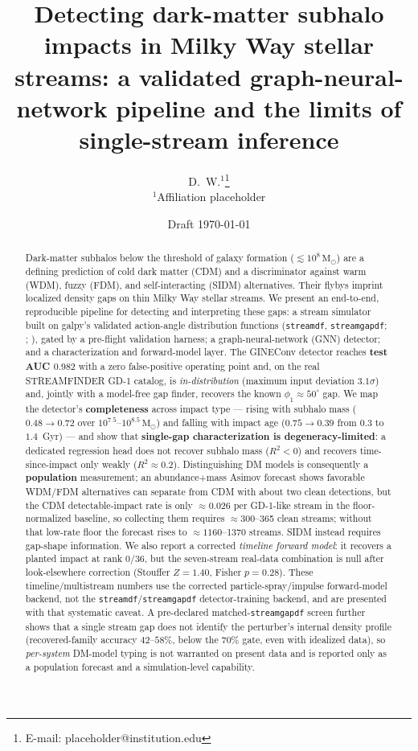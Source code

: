 \documentclass[fleqn,usenatbib]{mnras}
\title[DM subhalo impacts in stellar streams]{Detecting dark-matter subhalo impacts
in Milky Way stellar streams: a validated graph-neural-network pipeline and the
limits of single-stream inference}
\author[D. W. et al.]{D.~W.$^{1}$\thanks{E-mail: placeholder@institution.edu}
\\
$^{1}$Affiliation placeholder}
\date{Draft \today}
\newcommand{\msun}{\ensuremath{\mathrm{M}_\odot}}
\newcommand{\code}[1]{\texttt{#1}}
\begin{document}
\label{firstpage}
\maketitle

\begin{abstract}
Dark-matter subhalos below the threshold of galaxy formation ($\lesssim10^8\,\msun$)
are a defining prediction of cold dark matter (CDM) and a discriminator against warm
(WDM), fuzzy (FDM), and self-interacting (SIDM) alternatives. Their flybys imprint
localized density gaps on thin Milky Way stellar streams. We present an end-to-end,
reproducible pipeline for detecting and interpreting these gaps: a stream simulator
built on galpy's validated action-angle distribution functions (\code{streamdf},
\code{streamgapdf}; \citealt{Bovy2014streamdf}; \citealt{SandersBovyErkal2016}), gated
by a pre-flight validation harness; a graph-neural-network (GNN) detector; and a
characterization and forward-model layer. The GINEConv detector reaches \textbf{test
AUC $0.982$} with a zero false-positive operating point and, on the real STREAMFINDER
GD-1 catalog, is \emph{in-distribution} (maximum input deviation $3.1\sigma$) and,
jointly with a model-free gap finder, recovers the known $\phi_1\approx50^\circ$ gap.
We map the detector's \textbf{completeness} across impact type --- rising with subhalo
mass ($0.48\rightarrow0.72$ over $10^{7.5}$--$10^{8.5}\,\msun$) and falling with
impact age ($0.75\rightarrow0.39$ from $0.3$ to $1.4$~Gyr) --- and show that
\textbf{single-gap characterization is degeneracy-limited}: a dedicated regression
head does not recover subhalo mass ($R^2<0$) and recovers time-since-impact only
weakly ($R^2\approx0.2$). Distinguishing DM models is consequently a \textbf{population}
measurement; an abundance+mass Asimov forecast shows favorable WDM/FDM alternatives can
separate from CDM with about two clean detections, but the CDM detectable-impact rate is
only ${\approx}0.026$ per GD-1-like stream in the floor-normalized baseline, so collecting
them requires ${\approx}300$--365 clean streams; without that low-rate floor the forecast
rises to ${\approx}1160$--1370 streams. SIDM instead requires gap-shape information. We also report a corrected
\emph{timeline forward model}: it recovers a planted impact at rank 0/36, but the
seven-stream real-data combination is null after look-elsewhere correction (Stouffer
$Z=1.40$, Fisher $p=0.28$). These timeline/multistream numbers use the corrected
particle-spray/impulse forward-model backend, not the \code{streamdf}/\code{streamgapdf}
detector-training backend, and are presented with that systematic caveat. A pre-declared
matched-\code{streamgapdf} screen further shows that a single stream gap does not identify
the perturber's internal density profile (recovered-family accuracy $42$--$58\%$, below the
$70\%$ gate, even with idealized data), so \emph{per-system} DM-model typing is not
warranted on present data and is reported only as a population forecast and a
simulation-level capability.
\end{abstract}
\end{document}
